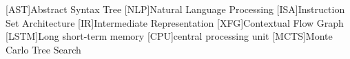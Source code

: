 \begin{acronym}[MCTS]\itemsep0pt
    [AST]{Abstract Syntax Tree}
    [NLP]{Natural Language Processing}
    [ISA]{Instruction Set Architecture}
    [IR]{Intermediate Representation}
    [XFG]{Contextual Flow Graph}
    [LSTM]{Long short-term memory}
    [CPU]{central processing unit}
    [MCTS]{Monte Carlo Tree Search}
\end{acronym}
